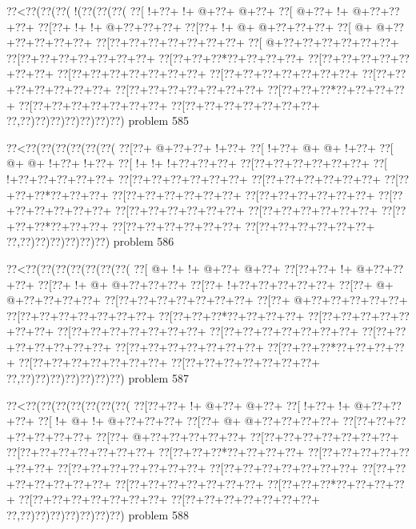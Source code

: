\vbox{\vbox{\goo
\0??<\0??(\0??(\0??(\- !(\0??(\0??(\0??(
\0??[\- !+\0??+\- !+\- @+\0??+\- @+\0??+
\0??[\- @+\0??+\- !+\- @+\0??+\0??+\0??+
\0??[\0??+\- !+\- !+\- @+\0??+\0??+\0??+
\0??[\0??+\- !+\- @+\- @+\0??+\0??+\0??+
\0??[\- @+\- @+\0??+\0??+\0??+\0??+\0??+
\0??[\0??+\0??+\0??+\0??+\0??+\0??+\0??+
\0??[\- @+\0??+\0??+\0??+\0??+\0??+\0??+
\0??[\0??+\0??+\0??+\0??+\0??+\0??+\0??+
\0??[\0??+\0??+\0??*\0??+\0??+\0??+\0??+
\0??[\0??+\0??+\0??+\0??+\0??+\0??+\0??+
\0??[\0??+\0??+\0??+\0??+\0??+\0??+\0??+
\0??[\0??+\0??+\0??+\0??+\0??+\0??+\0??+
\0??[\0??+\0??+\0??+\0??+\0??+\0??+\0??+
\0??[\0??+\0??+\0??+\0??+\0??+\0??+\0??+
\0??[\0??+\0??+\0??*\0??+\0??+\0??+\0??+
\0??[\0??+\0??+\0??+\0??+\0??+\0??+\0??+
\0??[\0??+\0??+\0??+\0??+\0??+\0??+\0??+
\0??,\0??)\0??)\0??)\0??)\0??)\0??)\0??)
}
\hfil problem 585\hfil\break
}

\vbox{\vbox{\goo
\0??<\0??(\0??(\0??(\0??(\0??(\0??(
\0??[\0??+\- @+\0??+\0??+\- !+\0??+
\0??[\- !+\0??+\- @+\- @+\- !+\0??+
\0??[\- @+\- @+\- !+\0??+\- !+\0??+
\0??[\- !+\- !+\- !+\0??+\0??+\0??+
\0??[\0??+\0??+\0??+\0??+\0??+\0??+
\0??[\- !+\0??+\0??+\0??+\0??+\0??+
\0??[\0??+\0??+\0??+\0??+\0??+\0??+
\0??[\0??+\0??+\0??+\0??+\0??+\0??+
\0??[\0??+\0??+\0??*\0??+\0??+\0??+
\0??[\0??+\0??+\0??+\0??+\0??+\0??+
\0??[\0??+\0??+\0??+\0??+\0??+\0??+
\0??[\0??+\0??+\0??+\0??+\0??+\0??+
\0??[\0??+\0??+\0??+\0??+\0??+\0??+
\0??[\0??+\0??+\0??+\0??+\0??+\0??+
\0??[\0??+\0??+\0??*\0??+\0??+\0??+
\0??[\0??+\0??+\0??+\0??+\0??+\0??+
\0??[\0??+\0??+\0??+\0??+\0??+\0??+
\0??,\0??)\0??)\0??)\0??)\0??)\0??)
}
\hfil problem 586\hfil\break
}

\vbox{\vbox{\goo
\0??<\0??(\0??(\0??(\0??(\0??(\0??(\0??(
\0??[\- @+\- !+\- !+\- @+\0??+\- @+\0??+
\0??[\0??+\0??+\- !+\- @+\0??+\0??+\0??+
\0??[\0??+\- !+\- @+\- @+\0??+\0??+\0??+
\0??[\0??+\- !+\0??+\0??+\0??+\0??+\0??+
\0??[\0??+\- @+\- @+\0??+\0??+\0??+\0??+
\0??[\0??+\0??+\0??+\0??+\0??+\0??+\0??+
\0??[\0??+\- @+\0??+\0??+\0??+\0??+\0??+
\0??[\0??+\0??+\0??+\0??+\0??+\0??+\0??+
\0??[\0??+\0??+\0??*\0??+\0??+\0??+\0??+
\0??[\0??+\0??+\0??+\0??+\0??+\0??+\0??+
\0??[\0??+\0??+\0??+\0??+\0??+\0??+\0??+
\0??[\0??+\0??+\0??+\0??+\0??+\0??+\0??+
\0??[\0??+\0??+\0??+\0??+\0??+\0??+\0??+
\0??[\0??+\0??+\0??+\0??+\0??+\0??+\0??+
\0??[\0??+\0??+\0??*\0??+\0??+\0??+\0??+
\0??[\0??+\0??+\0??+\0??+\0??+\0??+\0??+
\0??[\0??+\0??+\0??+\0??+\0??+\0??+\0??+
\0??,\0??)\0??)\0??)\0??)\0??)\0??)\0??)
}
\hfil problem 587\hfil\break
}

\vbox{\vbox{\goo
\0??<\0??(\0??(\0??(\0??(\0??(\0??(\0??(
\0??[\0??+\0??+\- !+\- @+\0??+\- @+\0??+
\0??[\- !+\0??+\- !+\- @+\0??+\0??+\0??+
\0??[\- !+\- @+\- !+\- @+\0??+\0??+\0??+
\0??[\0??+\- @+\- @+\0??+\0??+\0??+\0??+
\0??[\0??+\0??+\0??+\0??+\0??+\0??+\0??+
\0??[\0??+\- @+\0??+\0??+\0??+\0??+\0??+
\0??[\0??+\0??+\0??+\0??+\0??+\0??+\0??+
\0??[\0??+\0??+\0??+\0??+\0??+\0??+\0??+
\0??[\0??+\0??+\0??*\0??+\0??+\0??+\0??+
\0??[\0??+\0??+\0??+\0??+\0??+\0??+\0??+
\0??[\0??+\0??+\0??+\0??+\0??+\0??+\0??+
\0??[\0??+\0??+\0??+\0??+\0??+\0??+\0??+
\0??[\0??+\0??+\0??+\0??+\0??+\0??+\0??+
\0??[\0??+\0??+\0??+\0??+\0??+\0??+\0??+
\0??[\0??+\0??+\0??*\0??+\0??+\0??+\0??+
\0??[\0??+\0??+\0??+\0??+\0??+\0??+\0??+
\0??[\0??+\0??+\0??+\0??+\0??+\0??+\0??+
\0??,\0??)\0??)\0??)\0??)\0??)\0??)\0??)
}
\hfil problem 588\hfil\break
}

